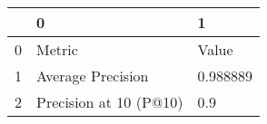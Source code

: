\begin{tabular}{lll}
\toprule
{} &                       0 &         1 \\
\midrule
0 &                  Metric &     Value \\
1 &       Average Precision &  0.988889 \\
2 &  Precision at 10 (P@10) &       0.9 \\
\bottomrule
\end{tabular}
